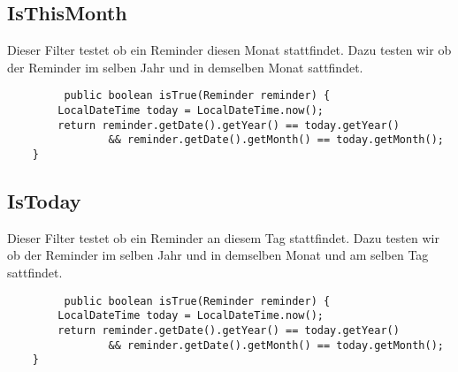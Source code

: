     
    \subsection{IsThisMonth}
    Dieser Filter testet ob ein Reminder diesen Monat stattfindet. Dazu  testen wir ob der Reminder im selben Jahr und in demselben Monat sattfindet.
    \begin{lstlisting}
         public boolean isTrue(Reminder reminder) {
        LocalDateTime today = LocalDateTime.now();
        return reminder.getDate().getYear() == today.getYear()
                && reminder.getDate().getMonth() == today.getMonth();
    }
    \end{lstlisting}

    \subsection{IsToday}
    
    Dieser Filter testet ob ein Reminder an diesem Tag stattfindet. Dazu  testen wir ob der Reminder im selben Jahr und in demselben Monat und am selben Tag sattfindet.
    \begin{lstlisting}
         public boolean isTrue(Reminder reminder) {
        LocalDateTime today = LocalDateTime.now();
        return reminder.getDate().getYear() == today.getYear()
                && reminder.getDate().getMonth() == today.getMonth();
    }
    \end{lstlisting}